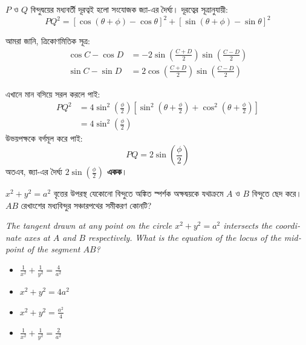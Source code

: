 \documentclass[12pt, a4paper]{article}
\begin{document}
\begin{tcolorbox}[solutionbox={সমাধান (Solution)}]
    \noindent
    $P$ ও  $Q$ বিন্দুদ্বয়ের মধ্যবর্তী দূরত্বই হলো সংযোজক জ্যা-এর দৈর্ঘ্য। দূরত্বের সূত্রানুযায়ী:
    \[ PQ^2 = \left[\cos(\theta + \phi) - \cos\theta\right]^2 + \left[\sin(\theta + \phi) - \sin\theta\right]^2 \]
    
    আমরা জানি, ত্রিকোণমিতিক সূত্র: 
    \begin{align*}
        \cos C - \cos D &= -2\sin\left(\frac{C+D}{2}\right)\sin\left(\frac{C-D}{2}\right) \\
        \sin C - \sin D &= 2\cos\left(\frac{C+D}{2}\right)\sin\left(\frac{C-D}{2}\right)
    \end{align*}
    
    এখানে মান বসিয়ে সরল করলে পাই:
    \begin{align*}
        PQ^2 &= 4\sin^2\left(\frac{\phi}{2}\right)\left[\sin^2\left(\theta + \frac{\phi}{2}\right) + \cos^2\left(\theta + \frac{\phi}{2}\right)\right] \\
             &= 4\sin^2\left(\frac{\phi}{2}\right)
    \end{align*}
    উভয়পক্ষকে বর্গমূল করে পাই: 
    \[ PQ = 2\sin\left(\frac{\phi}{2}\right) \]
    অতএব, জ্যা-এর দৈর্ঘ্য \textbf{$2\sin\left(\frac{\phi}{2}\right)$ একক}।
\end{tcolorbox}

\vspace{2em}

\begin{tcolorbox}[questionbox={প্রশ্ন (Question) 35}]
    \noindent
    $x^2 + y^2 = a^2$ বৃত্তের উপরস্থ যেকোনো বিন্দুতে অঙ্কিত স্পর্শক অক্ষদ্বয়কে যথাক্রমে $A$ ও $B$ বিন্দুতে ছেদ করে। $AB$ রেখাংশের মধ্যবিন্দুর সঞ্চারপথের সমীকরণ কোনটি?
    
    \vspace{0.8em}
    \begin{english}
    \noindent\textit{\color{darkgray}
    The tangent drawn at any point on the circle $x^2 + y^2 = a^2$ intersects the coordinate axes at $A$ and $B$ respectively. What is the equation of the locus of the midpoint of the segment $AB$?
    }
    \end{english}
\end{tcolorbox}

\vspace{1em}
\begin{itemize}[label={}, leftmargin=1cm, itemsep=0.5em]
    \item[\textbf{A)}] $\frac{1}{x^2} + \frac{1}{y^2} = \frac{4}{a^2}$
    \item[\textbf{B)}] $x^2 + y^2 = 4a^2$
    \item[\textbf{C)}] $x^2 + y^2 = \frac{a^2}{4}$
    \item[\textbf{D)}] $\frac{1}{x^2} + \frac{1}{y^2} = \frac{2}{a^2}$
\end{itemize}
\end{document}
